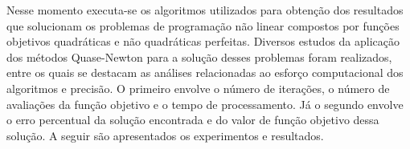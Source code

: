 Nesse momento executa-se os algoritmos utilizados para obtenção dos resultados que solucionam os problemas de programação não linear compostos por funções objetivos quadráticas e não quadráticas perfeitas. Diversos estudos da aplicação dos métodos Quase-Newton para a solução desses problemas foram realizados, entre os quais se destacam as análises relacionadas ao esforço computacional dos algoritmos e precisão. O primeiro envolve o número de iterações, o número de avaliações da função objetivo e o tempo de processamento. Já o segundo envolve o erro percentual da solução encontrada e do valor de função objetivo dessa solução. A seguir são apresentados os experimentos e resultados.